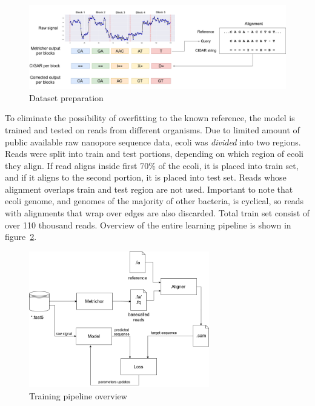 \documentclass[runningheads,a4paper]{llncs}
\begin{document}
\begin{figure}[!ht]
	\begin{center}
		\includegraphics[width=1\textwidth]{./imgs/train_data_correction.png}
		\caption{Dataset preparation}
		\label{fg:data_correction}
	\end{center}
\end{figure}


To eliminate the possibility of overfitting to the known reference, the model is trained and tested on reads from different organisms. Due to limited amount of public available raw nanopore sequence data, ecoli was \emph{divided} into two regions.
Reads were split into train and test portions, depending on which region of ecoli they align.
If read aligns inside first 70\% of the ecoli, it is placed into train set, and if it aligns to the second portion, it is placed into test set. Reads whose alignment overlaps train and test region are not used. Important to note that ecoli genome, and genomes of the majority of other bacteria, is cyclical, so reads with alignments that wrap over edges are also discarded. Total train set consist of over 110 thousand reads.
Overview of the entire learning pipeline is shown in figure~\ref{fg:train_pipe}.

\begin{figure}[!ht]
	\begin{center}
		\includegraphics[width=0.7\textwidth]{./imgs/train_pipeline.png}
		\caption{Training pipeline overview}
		\label{fg:train_pipe}
	\end{center}
\end{figure}
\end{document}
